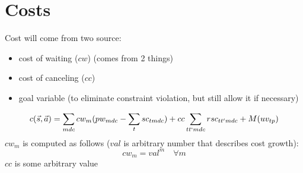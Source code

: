 \documentclass{article}
\begin{document}
\section{Costs}
Cost will come from two source:  
\begin{itemize} 
	\item cost of waiting ($cw$) (comes from 2 things)
	\item cost of canceling ($cc$)
	\item goal variable (to eliminate constraint violation, but still allow it if necessary)
\end{itemize}
\[ c(\vec{s}, \vec{a}) = \sum_{mdc} cw_{m} (pw_{mdc}- \sum_{t} sc_{tmdc}) + cc \sum_{tt`mdc} rsc_{tt'mdc} + M (uv_{tp})\]
$cw_{m}$ is computed as follows ($val$ is arbitrary number that describes cost growth):
	\[ cw_{m} = val^m \quad \forall m \]
$cc$ is some arbitrary value
\end{document}
